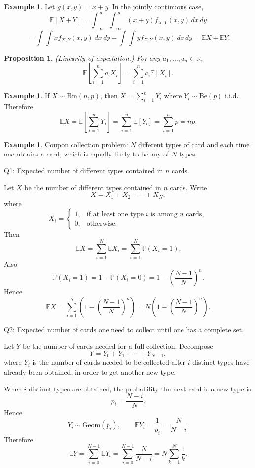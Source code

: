 \documentclass[11pt]{article}
\theoremstyle{plain}
\newtheorem{proposition}[theorem]{Proposition}
\theoremstyle{definition}
\newtheorem{example}[theorem]{Example}
\theoremstyle{remark}
\begin{document}
	\begin{example}
		Let \(g(x,y)=x+y\). In the jointly continuous case,
		\[
		\mathbb{E}[X+Y]
		=\int_{-\infty}^{\infty}\int_{-\infty}^{\infty} (x+y)f_{X,Y}(x,y)\,dx\,dy
		\]
		\[
		=\int\!\!\int x f_{X,Y}(x,y)\,dx\,dy+\int\!\!\int y f_{X,Y}(x,y)\,dx\,dy
		=\mathbb{E}X+\mathbb{E}Y.
		\]
	\end{example}
	
	\begin{proposition}
		(Linearity of expectation.)
		For any \(a_1,\dots,a_n\in\mathbb{R}\),
		\[
		\mathbb{E}\!\left[\sum_{i=1}^{n} a_i X_i\right]
		=\sum_{i=1}^{n} a_i \mathbb{E}[X_i].
		\]
	\end{proposition}
	
	\begin{example}
		If \(X\sim \mathrm{Bin}(n,p)\), then \(X=\sum_{i=1}^{n}Y_i\) where \(Y_i\sim \mathrm{Be}(p)\) i.i.d.
		Therefore
		\[
		\mathbb{E}X=\mathbb{E}\!\left[\sum_{i=1}^{n}Y_i\right]
		=\sum_{i=1}^{n}\mathbb{E}[Y_i]
		=\sum_{i=1}^{n}p
		=np.
		\]
	\end{example}
	
	
	
	\begin{example}
		
		Coupon collection problem: \(N\) different types of card and each time one obtains a card,
		which is equally likely to be any of \(N\) types.
		
		Q1: Expected number of different types contained in \(n\) cards.
		
		Let \(X\) be the number of different types contained in \(n\) cards.
		Write
		\[
		X=X_1+X_2+\cdots+X_N,
		\]
		where
		\[
		X_i=
		\begin{cases}
			1, & \text{if at least one type \(i\) is among \(n\) cards},\\
			0, & \text{otherwise}.
		\end{cases}
		\]
		Then
		\[
		\mathbb{E}X=\sum_{i=1}^{N}\mathbb{E}X_i=\sum_{i=1}^{N}\mathbb{P}(X_i=1).
		\]
		Also
		\[
		\mathbb{P}(X_i=1)=1-\mathbb{P}(X_i=0)
		=1-\left(\frac{N-1}{N}\right)^{n}.
		\]
		Hence
		\[
		\mathbb{E}X
		=\sum_{i=1}^{N}\left(1-\left(\frac{N-1}{N}\right)^n\right)
		=N\left(1-\left(\frac{N-1}{N}\right)^n\right).
		\]
		
		Q2: Expected number of cards one need to collect until one has a complete set.
		
		Let \(Y\) be the number of cards needed for a full collection.
		Decompose
		\[
		Y=Y_0+Y_1+\cdots+Y_{N-1},
		\]
		where \(Y_i\) is the number of cards needed to be collected after \(i\) distinct types have already been obtained,
		in order to get another new type.
		
		When \(i\) distinct types are obtained, the probability the next card is a new type is
		\[
		p_i=\frac{N-i}{N}.
		\]
		Hence
		\[
		Y_i\sim \mathrm{Geom}(p_i),
		\qquad
		\mathbb{E}Y_i=\frac{1}{p_i}=\frac{N}{N-i}.
		\]
		Therefore
		\[
		\mathbb{E}Y=\sum_{i=0}^{N-1}\mathbb{E}Y_i
		=\sum_{i=0}^{N-1}\frac{N}{N-i}
		=N\sum_{k=1}^{N}\frac{1}{k}.
		\]
		
	\end{example}
	
\end{document}
